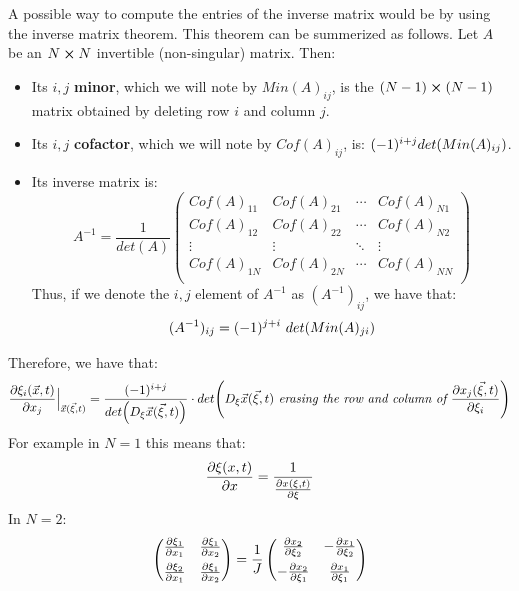 \documentclass[11pt, a4paper]{article} %
\begin{document}
A possible way to compute the entries of the inverse matrix would be by using the inverse matrix theorem. This theorem can be summerized as follows. Let $A$ be an $N\cross N$ invertible (non-singular) matrix. Then:
\begin{itemize}
\item Its $i,j$ {\bf minor}, which we will note by $Min(A)_{ij}$, is the $(N-1)\cross (N-1)$ matrix obtained by deleting row $i$ and column $j$.
\item Its $i,j$ {\bf cofactor}, which we will note by $Cof(A)_{ij}$, is: $(-1)^{i+j}det\qty(Min(A)_{ij})$.
\item Its inverse matrix is:
\begin{equation}
A^{-1}=\frac{1}{det(A)} \begin{pmatrix}
Cof(A)_{11} & Cof(A)_{21}&\cdots& Cof(A)_{N1}\\
Cof(A)_{12} & Cof(A)_{22}&\cdots& Cof(A)_{N2}\\
\vdots & \vdots & \ddots & \vdots \\
Cof(A)_{1N} & Cof(A)_{2N}&\cdots& Cof(A)_{NN}\\
\end{pmatrix}
\end{equation}
Thus, if we denote the $i,j$ element of $A^{-1}$ as $(A^{-1})_{ij}$, we have that:
\begin{equation}
(A^{-1})_{ij} = (-1)^{j+i}\ det\qty(Min(A)_{ji} )
\end{equation}
\end{itemize}
Therefore, we have that:
\begin{equation}\label{JacobChange}
\pdv{\xi_i(\vec{x},t)}{x_j}\Big\rvert_{\vec{x}(\vec{\xi},t)} = \frac{ (-1)^{i+j}}{det \qty(D_{\xi} \vec{x}(\vec{\xi},t))}\cdot det \qty(D_{\xi} \vec{x}(\vec{\xi},t)\textit{ erasing the row and column of }\pdv{x_j(\vec{\xi},t)}{\xi_i} )
\end{equation}
For example in $N=1$ this means that:
\begin{equation}
\pdv{\xi(x,t)}{x}=\frac{1}{\pdv{x(\xi,t)}{\xi}}
\end{equation}
In $N=2$:
\begin{equation}
\begin{pmatrix}
\pdv{\xi_1}{x_1} & \pdv{\xi_1}{x_2} \vspace{0.15cm}\\
\pdv{\xi_2}{x_1} & \pdv{\xi_1}{x_2}
\end{pmatrix}= \frac{1}{J} \begin{pmatrix}
\pdv{x_2}{\xi_2} & - \pdv{x_1}{\xi_2} \vspace{0.15cm}\\
-\pdv{x_2}{\xi_1} & \pdv{x_1}{\xi_1
} 
\end{pmatrix}
\end{equation}
\end{document}
